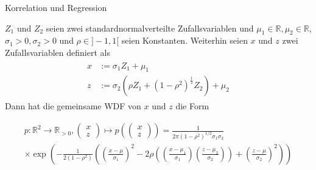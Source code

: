 \documentclass[
  8pt,
  ignorenonframetext,
]{beamer}
\begin{document}
\begin{frame}{Korrelation und Regression}
\protect\hypertarget{korrelation-und-regression-1}{}
\footnotesize
\begin{theorem}
\normalfont
\justifying
$Z_1$ und $Z_2$ seien zwei standardnormalverteilte Zufallsvariablen und
$\mu_1 \in \mathbb{R},\mu_2 \in \mathbb{R}$, $\sigma_1 > 0, \sigma_2 > 0$ und
$\rho \in ]-1,1[$ seien Konstanten. Weiterhin seien $x$ und $z$ zwei Zufallsvariablen
definiert als
\begin{align}
\begin{split}
x & := \sigma_1Z_1 + \mu_1 \\
z & := \sigma_2\left(\rho Z_1 + (1-\rho^2)^{\frac{1}{2}} Z_2 \right) + \mu_2
\end{split}
\end{align}
Dann hat die gemeinsame WDF von $x$ und $z$ die Form
\begin{tiny}
\begin{multline}
p : \mathbb{R}^2 \to \mathbb{R}_{>0}, \begin{pmatrix} x \\ z \end{pmatrix} \mapsto
p\left(\begin{pmatrix} x \\ z \end{pmatrix}\right) =  \frac{1}{2\pi (1-\rho^2)^{1/2}\sigma_1\sigma_2} \\
\times \exp\left(-\frac{1}{2(1-\rho^2)}
     \left(
       \left(\frac{x - \mu}{\sigma_1}\right)^2
     - 2\rho\left(\left(\frac{x - \mu_1}{\sigma_1}\right)\left(\frac{z - \mu_2}{\sigma_2}\right)\right)
     + \left(\frac{z - \mu}{\sigma_2}\right)^2
     \right)
     \right)
\end{multline}
\end{tiny}
\end{theorem}
\end{frame}
\end{document}
